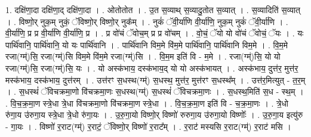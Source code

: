\documentclass[17pt]{extarticle}
\begin{document}
1. दक्षि॑णा॒दा दक्षि॑णा॒द् दक्षि॑णा॒दा । . ओतोतोत । . उ॒त स॒व्याथ् स॒व्यादु॒तोत स॒व्यात् । . स॒व्यादिति॑ स॒व्यात् । . विष्णो॒र् नुक॒म् नुकं॒ ॅविष्णो॒र् विष्णो॒र् नुक᳚म् । . नुकं॑ ॅवी॒र्या॑णि वी॒र्या॑णि॒ नुक॒म् नुकं॑ ॅवी॒र्या॑णि । . वी॒र्या॑णि॒ प्र प्र वी॒र्या॑णि वी॒र्या॑णि॒ प्र । . प्र वो॑चं ॅवोच॒म् प्र प्र वो॑चम् । . वो॒चं॒ ॅयो यो वो॑चं ॅवोचं॒ ॅयः । . यः पार्थि॑वानि॒ पार्थि॑वानि॒ यो यः पार्थि॑वानि । . पार्थि॑वानि विम॒मे वि॑म॒मे पार्थि॑वानि॒ पार्थि॑वानि विम॒मे । . वि॒म॒मे रजा(ग्म्॑)सि॒ रजा(ग्म्॑)सि विम॒मे वि॑म॒मे रजा(ग्म्॑)सि । . वि॒म॒म इति॑ वि - म॒मे । . रजा(ग्म्॑)सि॒ यो यो रजा(ग्म्॑)सि॒ रजा(ग्म्॑)सि॒ यः । . यो अस्क॑भाय॒ दस्क॑भाय॒द् यो यो अस्क॑भायत् । . अस्क॑भाय॒ दुत्त॑र॒ मुत्त॑र॒ मस्क॑भाय॒ दस्क॑भाय॒ दुत्त॑रम् । . उत्त॑रꣳ स॒धस्थ(ग्म्॑) स॒धस्थ॒ मुत्त॑र॒ मुत्त॑रꣳ स॒धस्थ᳚म् । . उत्त॑र॒मित्युत् - त॒र॒म् । . स॒धस्थं॑ ॅविचक्रमा॒णो वि॑चक्रमा॒णः स॒धस्थ(ग्म्॑) स॒धस्थं॑ ॅविचक्रमा॒णः । . स॒धस्थ॒मिति॑ स॒ध - स्थ॒म् । . वि॒च॒क्र॒मा॒ण स्त्रे॒धा त्रे॒धा वि॑चक्रमा॒णो वि॑चक्रमा॒ण स्त्रे॒धा । . वि॒च॒क्र॒मा॒ण इति॑ वि - च॒क्र॒मा॒णः । . त्रे॒धो रु॑गा॒य उ॑रुगा॒य स्त्रे॒धा त्रे॒धो रु॑गा॒यः । . उ॒रु॒गा॒यो विष्णो॒र् विष्णो॑ रुरुगा॒य उ॑रुगा॒यो विष्णोः᳚ । . उ॒रु॒गा॒य इत्यु॑रु - गा॒यः । . विष्णो॑ र॒राट(ग्म्॑) र॒राटं॒ ॅविष्णो॒र् विष्णो॑ र॒राट᳚म् । . र॒राट॑ मस्यसि र॒राट(ग्म्॑) र॒राट॑ मसि । \newline
\end{document}
